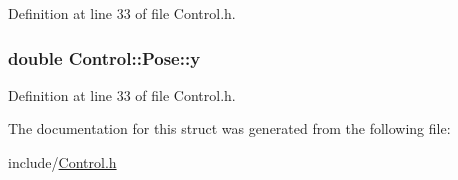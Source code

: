 Definition at line 33 of file Control.\-h.

\hypertarget{structControl_1_1Pose_ae8439b6ee06ad57f0a2e6d01efd71788}{
\subsubsection[{y}]{\setlength{\rightskip}{0pt plus 5cm}double Control\-::\-Pose\-::y}}\label{structControl_1_1Pose_ae8439b6ee06ad57f0a2e6d01efd71788}


Definition at line 33 of file Control.\-h.



The documentation for this struct was generated from the following file\-:\begin{DoxyCompactItemize}
\item 
include/\hyperlink{Control_8h}{Control.\-h}\end{DoxyCompactItemize}
